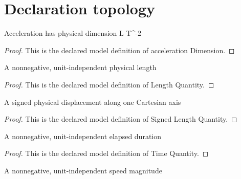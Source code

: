 \section{Declaration topology}
\begin{definition}
  \label{def:physics:phyx-mini-0740:phyxminiproblems-problemphyxmini0740-accelerationdimension}
  Acceleration has physical dimension L T\textasciicircum{}-2
\end{definition}
\begin{proof}
  This is the declared model definition of acceleration Dimension.
\end{proof}
\begin{definition}
  \label{def:physics:phyx-mini-0740:phyxminiproblems-problemphyxmini0740-lengthquantity}
  A nonnegative, unit-independent physical length
\end{definition}
\begin{proof}
  This is the declared model definition of Length Quantity.
\end{proof}
\begin{definition}
  \label{def:physics:phyx-mini-0740:phyxminiproblems-problemphyxmini0740-signedlengthquantity}
  A signed physical displacement along one Cartesian axis
\end{definition}
\begin{proof}
  This is the declared model definition of Signed Length Quantity.
\end{proof}
\begin{definition}
  \label{def:physics:phyx-mini-0740:phyxminiproblems-problemphyxmini0740-timequantity}
  A nonnegative, unit-independent elapsed duration
\end{definition}
\begin{proof}
  This is the declared model definition of Time Quantity.
\end{proof}
\begin{definition}
  \label{def:physics:phyx-mini-0740:phyxminiproblems-problemphyxmini0740-speedquantity}
  A nonnegative, unit-independent speed magnitude
\end{definition}
